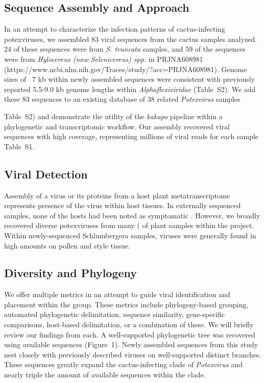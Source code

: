 \documentclass[fleqn,10pt,lineno]{wlpeerj}
\begin{document}
\subsection*{Sequence Assembly and Approach}
In an attempt to characterize the infection patterns of cactus-infecting potexviruses, we assembled 83 viral sequences from the cactus samples analyzed. 
24 of these sequences were from \textit{S. truncata} samples, and 59 of the sequences were from \textit{Hylocereus (now Selenicereus) spp.} in PRJNA608981 (https://www.ncbi.nlm.nih.gov/Traces/study/?acc=PRJNA608981)\citep{fan2020retracted}.
Genome sizes of ~7 kb within newly assembled sequences were consistent with previously reported 5.5-9.0 kb genome lengths within \textit{Alphaflexiviridae} \citep{kreuze_ictv_2020,ICTV_potexviruses}(Table~S2).
We add these 83 sequences to an existing database of 38 related \textit{Potexvirus} samples {Table~S2) and demonstrate the utility of the \textit{kakapo} pipeline within a phylogenetic and transcriptomic workflow. 
Our assembly recovered viral sequences with high coverage, representing millions of viral reads for each sample {Table~S1}.

 
\subsection*{Viral Detection}
Assembly of a virus or its proteins from a host plant metatranscriptome represents presence of the virus within host tissues. 
In externally sequenced samples, none of the hosts had been noted as symptomatic \citep{fan2020retracted}.
However, we broadly recovered diverse potexviruses from many (%
 of plant samples within the project.
 Within newly-sequenced Schlumbergera samples, viruses were generally found in high amounts on pollen and style tissue.


\subsection*{Diversity and Phylogeny}

We offer multiple metrics in an attempt to guide viral identification and placement within the group. 
These metrics include phylogeny-based grouping, automated phylogenetic delimitation, sequence similarity, gene-specific comparisons, host-based delimitation, or a combination of these. 
We will briefly review our findings from each.
A well-supported phylogenetic tree was recovered using available sequences (Figure~1).
Newly assembled sequences from this study nest closely with previously described viruses on well-supported distinct branches. 
These sequences greatly expand the cactus-infecting clade of \textit{Potexvirus} and nearly triple the amount of available sequences within the clade. 
}
\end{document}
